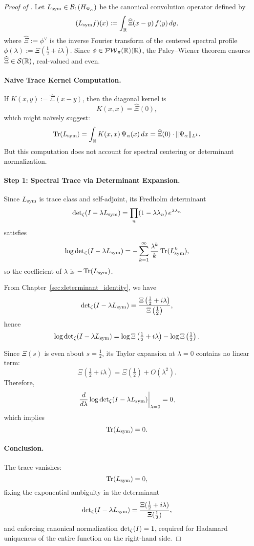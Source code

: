 \begin{proof}[Proof of ]
Let \( L_{\mathrm{sym}} \in \mathcal{B}_1(H_{\Psi_\alpha}) \) be the canonical convolution operator defined by
\[
(L_{\mathrm{sym}} f)(x) := \int_{\mathbb{R}} \widehat{\Xi}(x - y)\, f(y)\, dy,
\]
where \( \widehat{\Xi} := \phi^\vee \) is the inverse Fourier transform of the centered spectral profile \( \phi(\lambda) := \Xi\left( \tfrac{1}{2} + i\lambda \right) \). Since \( \phi \in \mathcal{PW}_{\pi}(\mathbb{R})(\mathbb{R}) \), the Paley--Wiener theorem ensures \( \widehat{\Xi} \in \mathcal{S}(\mathbb{R}) \), real-valued and even.

\paragraph{Naive Trace Kernel Computation.}
If \( K(x, y) := \widehat{\Xi}(x - y) \), then the diagonal kernel is
\[
K(x, x) = \widehat{\Xi}(0),
\]
which might naïvely suggest:
\[
\operatorname{Tr}(L_{\mathrm{sym}}) = \int_{\mathbb{R}} K(x, x)\, \Psi_\alpha(x)\, dx = \widehat{\Xi}(0) \cdot \|\Psi_\alpha\|_{L^1}.
\]
But this computation does not account for spectral centering or determinant normalization.

\paragraph{Step 1: Spectral Trace via Determinant Expansion.}
Since \( L_{\mathrm{sym}} \) is trace class and self-adjoint, its Fredholm determinant
\[
\det\nolimits_{\zeta}(I - \lambda L_{\mathrm{sym}}) = \prod_{n}(1 - \lambda \lambda_n)\, e^{\lambda \lambda_n}
\]
satisfies
\[
\log \det\nolimits_{\zeta}(I - \lambda L_{\mathrm{sym}}) = -\sum_{k=1}^\infty \frac{\lambda^k}{k} \operatorname{Tr}(L_{\mathrm{sym}}^k),
\]
so the coefficient of \( \lambda \) is \( -\operatorname{Tr}(L_{\mathrm{sym}}) \).

From Chapter~\ref{sec:determinant_identity}, we have
\[
\det\nolimits_{\zeta}(I - \lambda L_{\mathrm{sym}}) = \frac{\Xi\left( \tfrac{1}{2} + i\lambda \right)}{\Xi\left( \tfrac{1}{2} \right)},
\]
hence
\[
\log \det\nolimits_{\zeta}(I - \lambda L_{\mathrm{sym}}) = \log \Xi\left( \tfrac{1}{2} + i\lambda \right) - \log \Xi\left( \tfrac{1}{2} \right).
\]

Since \( \Xi(s) \) is even about \( s = \tfrac{1}{2} \), its Taylor expansion at \( \lambda = 0 \) contains no linear term:
\[
\Xi\left( \tfrac{1}{2} + i\lambda \right) = \Xi\left( \tfrac{1}{2} \right) + O(\lambda^2).
\]
Therefore,
\[
\left.\frac{d}{d\lambda} \log \det\nolimits_{\zeta}(I - \lambda L_{\mathrm{sym}})\right|_{\lambda = 0} = 0,
\]
which implies
\[
\operatorname{Tr}(L_{\mathrm{sym}}) = 0.
\]

\paragraph{Conclusion.}
The trace vanishes:
\[
\operatorname{Tr}(L_{\mathrm{sym}}) = 0,
\]
fixing the exponential ambiguity in the determinant
\[
\det\nolimits_{\zeta}(I - \lambda L_{\mathrm{sym}}) = \frac{\Xi(\tfrac{1}{2} + i\lambda)}{\Xi(\tfrac{1}{2})},
\]
and enforcing canonical normalization \( \det\nolimits_{\zeta}(I) = 1 \), required for Hadamard uniqueness of the entire function on the right-hand side.
\end{proof}
